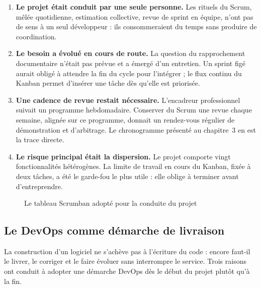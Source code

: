 \begin{enumerate}
  \item \textbf{Le projet était conduit par une seule personne.} Les rituels du
        Scrum, mêlée quotidienne, estimation collective, revue de sprint en
        équipe, n'ont pas de sens à un seul développeur : ils consommeraient du
        temps sans produire de coordination.

  \item \textbf{Le besoin a évolué en cours de route.} La question du
        rapprochement documentaire n'était pas prévue et a émergé d'un
        entretien. Un sprint figé aurait obligé à attendre la fin du cycle pour
        l'intégrer ; le flux continu du Kanban permet d'insérer une tâche dès
        qu'elle est priorisée.

  \item \textbf{Une cadence de revue restait nécessaire.} L'encadreur
        professionnel suivait un programme hebdomadaire. Conserver du Scrum une
        revue chaque semaine, alignée sur ce programme, donnait un rendez-vous
        régulier de démonstration et d'arbitrage. Le chronogramme présenté au
        chapitre~3 en est la trace directe.

  \item \textbf{Le risque principal était la dispersion.} Le projet comporte
        vingt fonctionnalités hétérogènes. La limite de travail en cours du
        Kanban, fixée à deux tâches, a été le garde-fou le plus utile : elle
        oblige à terminer avant d'entreprendre.
\end{enumerate}

\begin{figure}[htbp]
\centering
{}
\caption{Le tableau Scrumban adopté pour la conduite du projet}
\label{fig:scrumban}
\end{figure}

\subsection{Le DevOps comme démarche de livraison}

La construction d'un logiciel ne s'achève pas à l'écriture du code : encore
faut-il le livrer, le corriger et le faire évoluer sans interrompre le service.
Trois raisons ont conduit à adopter une démarche DevOps dès le début du projet
plutôt qu'à la fin.

